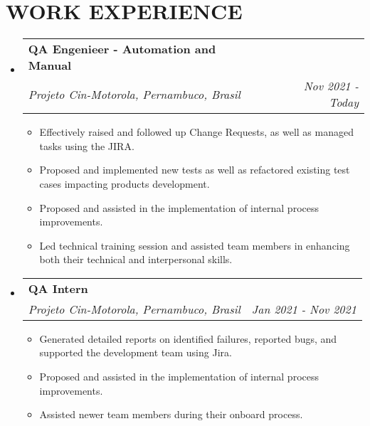 \documentclass[letterpaper,11pt]{article}
\makeatletter
\newcommand{\resumeItem}[1]{
  \item\small{
    {#1 \vspace{-1pt}}
  }
}
\newcommand{\resumeSubheading}[4]{
  \vspace{-2pt}\item
    \begin{tabular*}{1.0\textwidth}[t]{l@{\extracolsep{\fill}}r}
      \textbf{\large#1} & \textbf{\small #2} \\
      \textit{\large#3} & \textit{\small #4} \\
      
    \end{tabular*}\vspace{-7pt}
}
\newcommand{\resumeSubHeadingListStart}{\begin{itemize}[leftmargin=0.0in, label={}]}
\newcommand{\resumeSubHeadingListEnd}{\end{itemize}}
\newcommand{\resumeItemListStart}{\begin{itemize}[leftmargin=0.1in]}
\newcommand{\resumeItemListEnd}{\end{itemize}\vspace{-5pt}}
\makeatother
\begin{document}
\section{\color{airforceblue}WORK EXPERIENCE}
  \resumeSubHeadingListStart

    \resumeSubheading
      {QA Engenieer - Automation and Manual}{} 
      {Projeto Cin-Motorola, Pernambuco, Brasil}{Nov 2021 - Today}
      \resumeItemListStart
            \resumeItem{\normalsize{Effectively raised and followed up Change Requests, as well as managed tasks using the JIRA.}}
            \resumeItem{\normalsize{Proposed and implemented new tests as well as refactored existing test cases impacting products development.}}
            \resumeItem{\normalsize{Proposed and assisted in the implementation of internal process improvements.}}  
            \resumeItem{\normalsize{Led technical training session and assisted team members in enhancing both their technical and interpersonal skills.}}  
      \resumeItemListEnd  

    \resumeSubheading
      {QA Intern}{} 
	  {Projeto Cin-Motorola, Pernambuco, Brasil}{Jan 2021 - Nov 2021}
      \resumeItemListStart
            \resumeItem{\normalsize{Generated detailed reports on identified failures, reported bugs, and supported the development team using Jira.}}
            \resumeItem{\normalsize{Proposed and assisted in the implementation of internal process improvements.}}  
            \resumeItem{\normalsize{Assisted newer team members during their onboard process.}}  
      \resumeItemListEnd  


  \resumeSubHeadingListEnd
\vspace{-12pt}
\end{document}
